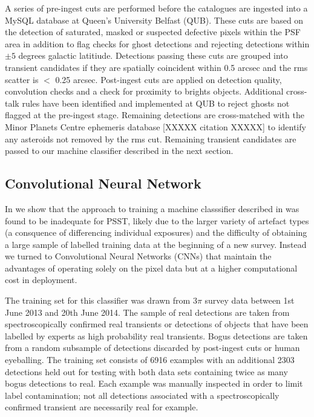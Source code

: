 \documentclass[a4paper,fleqn,usenatbib]{mnras}
\begin{document}
A series of pre-ingest cuts are performed before the catalogues are ingested into a MySQL database at Queen's University Belfast (QUB).  These cuts are based on the detection of saturated, masked or suspected defective pixels within the PSF area in addition to flag checks for ghost detections and rejecting detections within $\pm 5$ degrees galactic latitiude. Detections passing these cuts are grouped into transient candidates if they are spatially coincident within 0.5 arcsec and the rms scatter is $<$ 0.25 arcsec.  Post-ingest cuts are applied on detection quality, convolution checks and a check for proximity to brights objects.  Additional cross-talk rules have been identified and implemented at QUB to reject ghosts
not flagged at the pre-ingest stage.  Remaining detections are cross-matched with the Minor Planets Centre ephemeris database [XXXXX citation XXXXX] to identify any asteroids not 
removed by the rms cut.  Remaining transient candidates are passed to our machine classifier described in the next section.

\subsection{Convolutional Neural Network}
\label{sec:cnn}

In \citet{Wright16} we show that the approach to training a machine classsifier described in \citet{Wright15} was found to be inadequate for PSST, likely due to the larger variety of artefact types (a consquence of differencing individual exposures) and the difficulty  of obtaining a large sample of labelled training data at the beginning of a new survey.  Instead we turned to Convolutional Neural Networks (CNNs) that maintain the advantages of operating solely on the pixel data but at a higher computational cost in deployment.  

The training set for this classifier was drawn from $3\pi$ survey data between 1st June 2013 and 20th June 2014.  The sample of real detections are taken from spectroscopically confirmed real transients or detections of objects that have been labelled by experts as high probability real transients.  Bogus detections are taken from a random subsample of detections discarded by post-ingest cuts or human eyeballing.  The training set consists of 6916 examples with an additional 2303 detections held out for testing with both data sets containing twice as many bogus detections to real. Each example was manually inspected in order to limit label contamination; not all detections associated with a spectroscopically confirmed transient are necessarily real for example.
\end{document}
